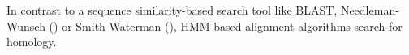 In contrast to a sequence similarity-based search tool like BLAST,
Needleman-Wunsch (\cite{needleman1970}) or Smith-Waterman (\cite{smith1981}),
HMM-based alignment algorithms search for homology. 
